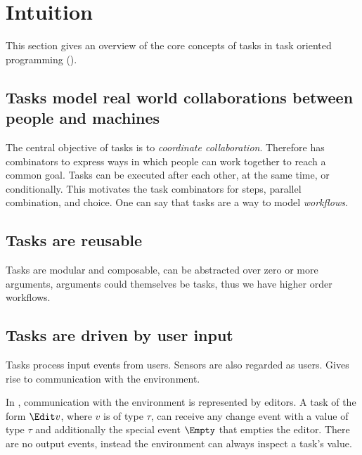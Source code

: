 


\section{Intuition}
\label{sec:intuition}

This section gives an overview of the core concepts of tasks in task oriented programming (\TOP).



\subsection{Tasks model real world collaborations between people and machines}

The central objective of tasks is to \emph{coordinate collaboration}.
Therefore \TOPHAT has combinators to express ways in which people can work together to reach a common goal.
Tasks can be executed after each other, at the same time, or conditionally.
This motivates the task combinators for steps, parallel combination, and choice.
One can say that tasks are a way to model \emph{workflows}.



\subsection{Tasks are reusable}

Tasks are modular and composable,
can be abstracted over zero or more arguments,
arguments could themselves be tasks,
thus we have higher order workflows.




\subsection{Tasks are driven by user input}

Tasks process input events from users.
Sensors are also regarded as users.
Gives rise to communication with the environment.

In \TOPHAT, communication with the environment is represented by editors.
A task of the form $\Edit v$, where $v$ is of type $\tau$, can receive any change event with a value of type $\tau$ and additionally the special event $\Empty$ that empties the editor.
There are no output events, instead the environment can always inspect a task's value.

